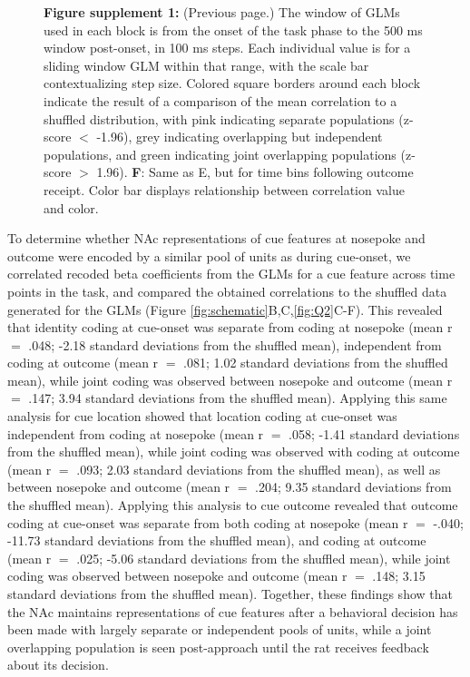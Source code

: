 \documentclass[11pt]{article}
\newcommand{\bsf}[1]{\textbf{#1}}
\begin{document}
\addtocounter{figure}{-1}
\begin{figure} [t!]
  \caption*{\bsf{Figure supplement 1:} (Previous page.) The window of GLMs used in each block is from the onset of the task phase to the 500 ms window post-onset, in 100 ms steps. Each individual value is for a sliding window GLM within that range, with the scale bar contextualizing step size. Colored square borders around each block indicate the result of a comparison of the mean correlation to a shuffled distribution, with pink indicating separate populations (z-score $<$ -1.96), grey indicating overlapping but independent populations, and green indicating joint overlapping populations (z-score $>$ 1.96). \bsf{F}: Same as E, but for time bins following outcome receipt. Color bar displays relationship between correlation value and color.}
\end{figure}

To determine whether NAc representations of cue features at nosepoke and outcome were encoded by a similar pool of units as during cue-onset, we correlated recoded beta coefficients from the GLMs for a cue feature across time points in the task, and compared the obtained correlations to the shuffled data generated for the GLMs (Figure \ref{fig:schematic}B,C,\ref{fig:Q2}C-F). This revealed that identity coding at cue-onset was separate from coding at nosepoke (mean r  $=$ .048; -2.18 standard deviations from the shuffled mean), independent from coding at outcome (mean r  $=$ .081; 1.02 standard deviations from the shuffled mean), while joint coding was observed between nosepoke and outcome (mean r  $=$ .147; 3.94 standard deviations from the shuffled mean). Applying this same analysis for cue location showed that location coding at cue-onset was independent from coding at nosepoke (mean r  $=$ .058; -1.41 standard deviations from the shuffled mean), while joint coding was observed with coding at outcome (mean r  $=$ .093; 2.03 standard deviations from the shuffled mean), as well as between nosepoke and outcome (mean r  $=$ .204; 9.35 standard deviations from the shuffled mean). Applying this analysis to cue outcome revealed that outcome coding at cue-onset was separate from both coding at nosepoke (mean r  $=$ -.040; -11.73 standard deviations from the shuffled mean), and coding at outcome (mean r  $=$ .025; -5.06 standard deviations from the shuffled mean), while joint coding was observed between nosepoke and outcome (mean r  $=$ .148; 3.15 standard deviations from the shuffled mean). Together, these findings show that the NAc maintains representations of cue features after a behavioral decision has been made with largely separate or independent pools of units, while a joint overlapping population is seen post-approach until the rat receives feedback about its decision.
\end{document}
